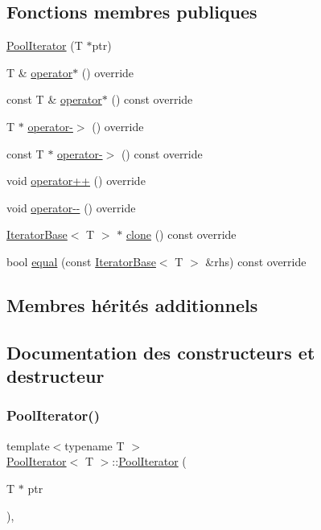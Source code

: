 \subsection*{Fonctions membres publiques}
\begin{DoxyCompactItemize}
\item 
\hyperlink{class_pool_iterator_a5c4bd22679d557a14326b018850874bb}{Pool\+Iterator} (T $\ast$ptr)
\item 
T \& \hyperlink{class_pool_iterator_a3acdd751b297473d78eedb7422c7a66c}{operator$\ast$} () override
\item 
const T \& \hyperlink{class_pool_iterator_ab8a7e0669bfd1cd4335ca726bba77127}{operator$\ast$} () const override
\item 
T $\ast$ \hyperlink{class_pool_iterator_ae2893041831d8c29f222af7fe184fe09}{operator-\/$>$} () override
\item 
const T $\ast$ \hyperlink{class_pool_iterator_a228d6ee24cd015a7312fa9f76244994c}{operator-\/$>$} () const override
\item 
void \hyperlink{class_pool_iterator_a0da86ab88d60973aee45e6a51a929138}{operator++} () override
\item 
void \hyperlink{class_pool_iterator_aa1f588a47b0c11d6e064e34b129337ae}{operator-\/-\/} () override
\item 
\hyperlink{class_iterator_base}{Iterator\+Base}$<$ T $>$ $\ast$ \hyperlink{class_pool_iterator_ae39cdb4bbb84e88cf0d9009e7bdae586}{clone} () const override
\item 
bool \hyperlink{class_pool_iterator_adbbef39e72972414b1bbb6d6bb885bb1}{equal} (const \hyperlink{class_iterator_base}{Iterator\+Base}$<$ T $>$ \&rhs) const override
\end{DoxyCompactItemize}
\subsection*{Membres hérités additionnels}


\subsection{Documentation des constructeurs et destructeur}
\mbox{\label{class_pool_iterator_a5c4bd22679d557a14326b018850874bb}} 
\subsubsection{\texorpdfstring{Pool\+Iterator()}{PoolIterator()}}
{\footnotesize\ttfamily template$<$typename T $>$ \\
\hyperlink{class_pool_iterator}{Pool\+Iterator}$<$ T $>$\+::\hyperlink{class_pool_iterator}{Pool\+Iterator} (\begin{DoxyParamCaption}\item[{T $\ast$}]{ptr }\end{DoxyParamCaption})\hspace{0.3cm}{\ttfamily [inline]}, {\ttfamily [explicit]}}



